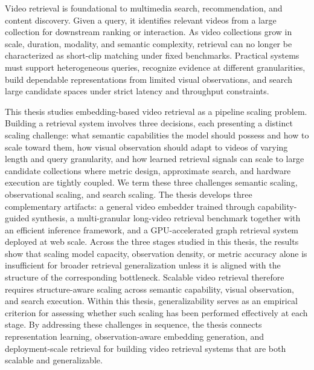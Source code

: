 Video retrieval is foundational to multimedia search, recommendation, and content discovery. Given a query, it identifies relevant videos from a large collection for downstream ranking or interaction. As video collections grow in scale, duration, modality, and semantic complexity, retrieval can no longer be characterized as short-clip matching under fixed benchmarks. Practical systems must support heterogeneous queries, recognize evidence at different granularities, build dependable representations from limited visual observations, and search large candidate spaces under strict latency and throughput constraints.

This thesis studies embedding-based video retrieval as a pipeline scaling problem. Building a retrieval system involves three decisions, each presenting a distinct scaling challenge: what semantic capabilities the model should possess and how to scale toward them, how visual observation should adapt to videos of varying length and query granularity, and how learned retrieval signals can scale to large candidate collections where metric design, approximate search, and hardware execution are tightly coupled. We term these three challenges semantic scaling, observational scaling, and search scaling. The thesis develops three complementary artifacts: a general video embedder trained through capability-guided synthesis, a multi-granular long-video retrieval benchmark together with an efficient inference framework, and a GPU-accelerated graph retrieval system deployed at web scale. Across the three stages studied in this thesis, the results show that scaling model capacity, observation density, or metric accuracy alone is insufficient for broader retrieval generalization unless it is aligned with the structure of the corresponding bottleneck. Scalable video retrieval therefore requires structure-aware scaling across semantic capability, visual observation, and search execution. Within this thesis, generalizability serves as an empirical criterion for assessing whether such scaling has been performed effectively at each stage. By addressing these challenges in sequence, the thesis connects representation learning, observation-aware embedding generation, and deployment-scale retrieval for building video retrieval systems that are both scalable and generalizable.
